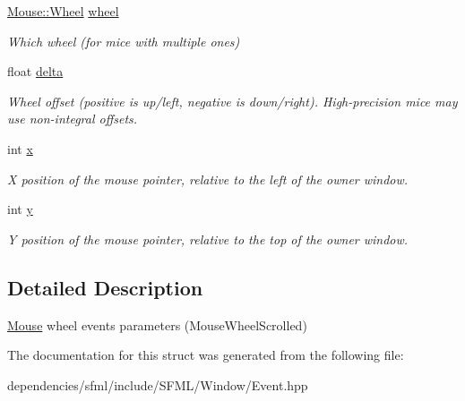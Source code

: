 \begin{DoxyCompactItemize}
\item 
\mbox{\label{structsf_1_1_event_1_1_mouse_wheel_scroll_event_a1d82dccecc46968d517b2fc66639dd74}} 
\hyperlink{classsf_1_1_mouse_a60dd479a43f26f200e7957aa11803ff4}{Mouse\+::\+Wheel} \hyperlink{structsf_1_1_event_1_1_mouse_wheel_scroll_event_a1d82dccecc46968d517b2fc66639dd74}{wheel}
\begin{DoxyCompactList}\small\item\em Which wheel (for mice with multiple ones) \end{DoxyCompactList}\item 
\mbox{\label{structsf_1_1_event_1_1_mouse_wheel_scroll_event_ac45c164997a594d424071e74b53b5817}} 
float \hyperlink{structsf_1_1_event_1_1_mouse_wheel_scroll_event_ac45c164997a594d424071e74b53b5817}{delta}
\begin{DoxyCompactList}\small\item\em Wheel offset (positive is up/left, negative is down/right). High-\/precision mice may use non-\/integral offsets. \end{DoxyCompactList}\item 
\mbox{\label{structsf_1_1_event_1_1_mouse_wheel_scroll_event_a3d17cae0568d18083f879655abdc8ae4}} 
int \hyperlink{structsf_1_1_event_1_1_mouse_wheel_scroll_event_a3d17cae0568d18083f879655abdc8ae4}{x}
\begin{DoxyCompactList}\small\item\em X position of the mouse pointer, relative to the left of the owner window. \end{DoxyCompactList}\item 
\mbox{\label{structsf_1_1_event_1_1_mouse_wheel_scroll_event_aa38bf23704162024eed19917eef3853c}} 
int \hyperlink{structsf_1_1_event_1_1_mouse_wheel_scroll_event_aa38bf23704162024eed19917eef3853c}{y}
\begin{DoxyCompactList}\small\item\em Y position of the mouse pointer, relative to the top of the owner window. \end{DoxyCompactList}\end{DoxyCompactItemize}


\subsection{Detailed Description}
\hyperlink{classsf_1_1_mouse}{Mouse} wheel events parameters (Mouse\+Wheel\+Scrolled) 

The documentation for this struct was generated from the following file\+:\begin{DoxyCompactItemize}
\item 
dependencies/sfml/include/\+S\+F\+M\+L/\+Window/Event.\+hpp\end{DoxyCompactItemize}
